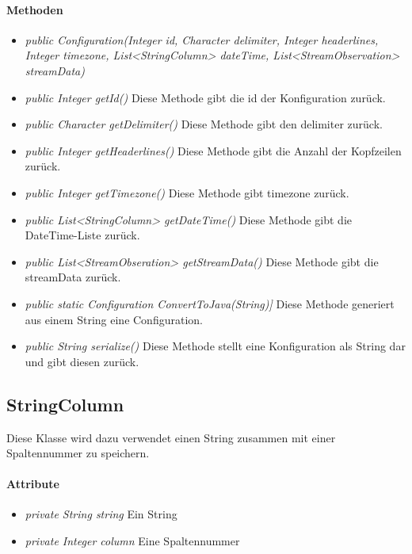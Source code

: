 \paragraph{Methoden}
\begin{itemize}
	\item \textit{public Configuration(Integer id, Character delimiter, Integer headerlines, Integer timezone, List<StringColumn> dateTime, List<StreamObservation> streamData)}
	
	\item \textit{public Integer getId()} Diese Methode gibt die id der Konfiguration zurück.
	
	\item \textit{public Character getDelimiter()} Diese Methode gibt den delimiter zurück.
	
	\item \textit{public Integer getHeaderlines()} Diese Methode gibt die Anzahl der Kopfzeilen zurück.
	
	\item \textit{public Integer getTimezone()} Diese Methode gibt timezone zurück.	
	
	\item \textit{public List<StringColumn> getDateTime()} Diese Methode gibt die DateTime-Liste zurück.
	
	\item \textit{public List<StreamObseration> getStreamData()} Diese Methode gibt die streamData zurück.

	\item \textit{public static Configuration ConvertToJava(String)]} Diese Methode generiert aus einem String eine Configuration.
	
	\item \textit{public String serialize()} Diese Methode stellt eine Konfiguration als String dar und gibt diesen zurück.
\end{itemize}


\subsection{StringColumn}
Diese Klasse wird dazu verwendet einen String zusammen mit einer Spaltennummer zu speichern.
\paragraph{Attribute}
\begin{itemize}
	\item \textit{private String string} Ein String
	\item \textit{private Integer column} Eine Spaltennummer
\end{itemize} 

